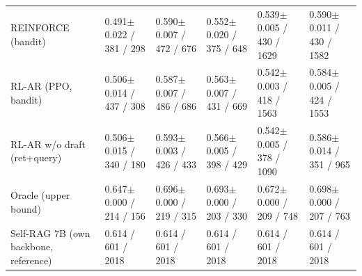 \begin{table}
\begin{tabular}{llllll}
REINFORCE (bandit) & 0.491$\pm$0.022 / 381 / 298 & 0.590$\pm$0.007 / 472 / 676 & 0.552$\pm$0.020 / 375 / 648 & 0.539$\pm$0.005 / 430 / 1629 & 0.590$\pm$0.011 / 430 / 1582 \\
RL-AR (PPO, bandit) & 0.506$\pm$0.014 / 437 / 308 & 0.587$\pm$0.007 / 486 / 686 & 0.563$\pm$0.007 / 431 / 669 & 0.542$\pm$0.003 / 418 / 1563 & 0.584$\pm$0.005 / 424 / 1553 \\
RL-AR w/o draft (ret+query) & 0.506$\pm$0.015 / 340 / 180 & 0.593$\pm$0.003 / 426 / 433 & 0.566$\pm$0.005 / 398 / 429 & 0.542$\pm$0.005 / 378 / 1090 & 0.586$\pm$0.014 / 351 / 965 \\
Oracle (upper bound) & 0.647$\pm$0.000 / 214 / 156 & 0.696$\pm$0.000 / 219 / 315 & 0.693$\pm$0.000 / 203 / 330 & 0.672$\pm$0.000 / 209 / 748 & 0.698$\pm$0.000 / 207 / 763 \\
Self-RAG 7B (own backbone, reference) & 0.614 / 601 / 2018 & 0.614 / 601 / 2018 & 0.614 / 601 / 2018 & 0.614 / 601 / 2018 & 0.614 / 601 / 2018 \\
\bottomrule
\end{tabular}
\end{table}
